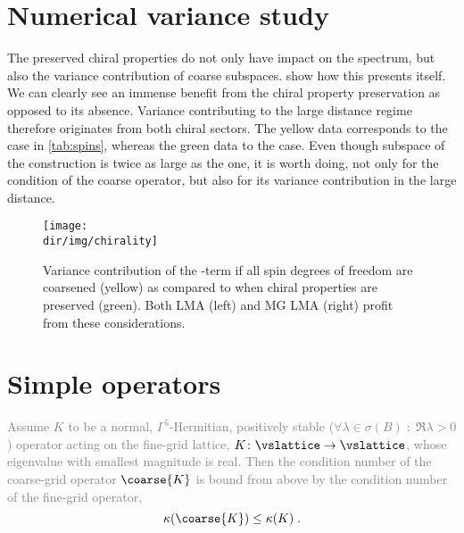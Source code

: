 \section{Numerical variance study}

The preserved chiral properties do not only have impact on the spectrum, but also the variance contribution of coarse subspaces.
 show how this presents itself.
We can clearly see an immense benefit from the chiral property preservation as opposed to its absence.
Variance contributing to the large distance regime therefore originates from both chiral sectors.
The yellow data corresponds to the  case in \ref{tab:spins}, whereas the green data to the  case.
Even though subspace of the  construction is twice as large as the  one, it is worth doing, not only for the condition of the coarse operator, but also for its variance contribution in the large distance.
\begin{figure}
\centering
\texttt{[image: \\dir/img/chirality]}
\caption{
Variance contribution of the -term if all spin degrees of freedom are coarsened (yellow) as compared to when chiral properties are preserved (green).
Both LMA (left) and MG LMA (right) profit from these considerations.
\takenfull
}
\label{fig:chirality:variance}
\end{figure}



\section{Simple operators}



\textcolor{gray}{
\begin{theorem} \label{thm:cond:normal:pos:stable}
Assume $K$ to be a normal, $\Gamma^{5}$-Hermitian, positively stable ($\forall \lambda \in \sigma(B) \; : \; \Re{\lambda} > 0$) operator acting on the fine-grid lattice, $K \colon \vslattice \rightarrow \vslattice$, whose eigenvalue with smallest magnitude is real.
Then the condition number of the coarse-grid operator $\coarse{K}$ is bound from above by the condition number of the fine-grid operator,
\begin{equation}
\kappa(\coarse{K}) \leq \kappa(K) \;.
\end{equation}
\end{theorem}
}

